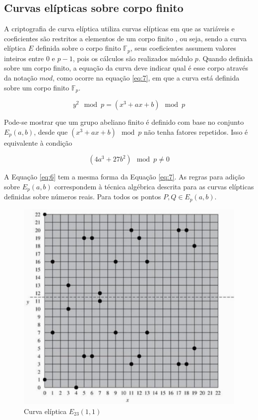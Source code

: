 %
%
\subsection{Curvas elípticas sobre corpo finito}
A criptografia de curva elíptica utiliza curvas elípticas em que as variáveis e coeficientes são restritos a elementos de um corpo finito \cite{Stallings:2011}, ou seja, sendo a curva elíptica $E$ definida sobre o corpo finito $\mathbb{F}_p$, seus coeficientes assumem valores inteiros entre 0 e $p - 1$, pois os cálculos são realizados módulo \(p\). Quando definida sobre um corpo finito, a equação da curva deve indicar qual é esse corpo através da notação $mod$, como ocorre na equação \ref{eq:7}, em que a curva está definida sobre um corpo finito $\mathbb{F}_p$.

\begin{equation}
y^2 \mod p = (x^3 + ax + b) \mod p \label{eq:7}
\end{equation}

Pode-se mostrar que um grupo abeliano finito é definido com base no conjunto $E_p(a, b)$, desde que $(x^3 + ax + b) \mod p$ não tenha fatores repetidos. Isso é equivalente à condição

\begin{equation}
(4a^3 + 27b^2) \mod p \neq 0
\end{equation}

A Equação \ref{eq:6} tem a mesma forma da Equação \ref{eq:7}. As regras para adição sobre $E_p(a, b)$ correspondem à técnica algébrica descrita para as curvas elípticas definidas sobre números reais. Para todos os pontos $P, Q \in E_p(a, b)$.

\begin{figure}[h]
\centering
\includegraphics[scale=0.6, bb=0 0 515 478]{figuras/curva_sobre_corpo_finito.eps}
\caption{Curva elíptica $E_{23}(1, 1)$}
\label{fig:curva_exemplo}
\end{figure}

